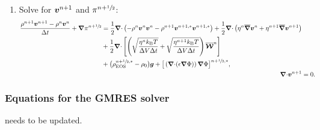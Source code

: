 \documentclass[
10pt
showpacs, showkeys,
amsmath,amssymb,
aps,
pre,
floatfix,
]{revtex4-1}
\newcommand{\divg}{{\V\nabla\cdot}}                       %
\begin{document}
\begin{enumerate}
\item Solve for $\boldsymbol{v}^{n+1}$ and $\pi^{n+\sfrac{1}{2}}$:
\begin{align}
\label{boussinesq_stokes_v_2nd}
\begin{split}
\frac{\rho^{n+1}\V{v}^{n+1}-\rho^n\V{v}^n}{\D{t}} + \grad\pi^{n+\myhalf}
&= \frac{1}{2}\divg\left(-\rho^n\V{v}^n\V{v}^n-\rho^{n+1}\V{v}^{n+1,*}\V{v}^{n+1,*}\right) 
+ \frac{1}{2}\divg\left( \eta^n \overline{\grad}\V{v}^n + \eta^{n+1} \overline{\grad}\V{v}^{n+1} \right) \\
&+ \frac{1}{2}\divg\left[\left( \sqrt{\frac{\eta^n k_\mathrm{B}T}{\D{V}\D{t}}} + \sqrt{\frac{\eta^{n+1} k_\mathrm{B}T}{\D{V}\D{t}}} \right) \overline{\V{\mathcal{W}}}^n \right] \\
&+ \big(\rho^{n+\myhalf,*}_\mathrm{EOS}-\rho_0\big)\V{g} 
+ \big[\left(\divg(\epsilon\grad\Phi)\right)\grad\Phi\big]^{n+\myhalf,*}, 
\end{split} \\
\label{boussinesq_stokes_p_2nd}
\divg\V{v}^{n+1} & = 0.
\end{align}

\end{enumerate}



\clearpage



\subsubsection*{Equations for the GMRES solver}

{\color{red}needs to be updated.}
\end{document}
